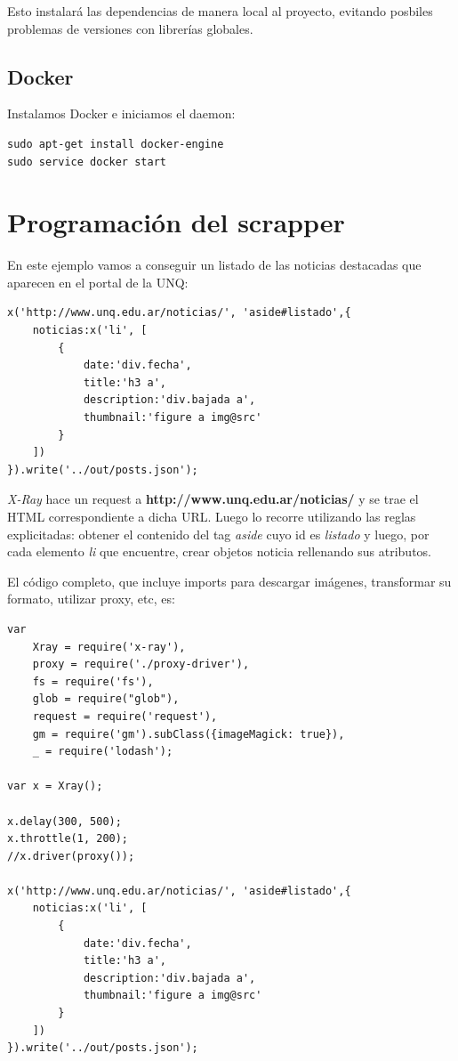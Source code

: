 \documentclass[12pt]{article}
\begin{document}
Esto instalará las dependencias de manera local al proyecto, evitando posbiles problemas de versiones con librerías globales.

\subsection{Docker}

Instalamos Docker e iniciamos el daemon:

\begin{verbatim}
sudo apt-get install docker-engine
sudo service docker start
\end{verbatim}


\section{Programación del scrapper}

En este ejemplo vamos a conseguir un listado de las noticias destacadas que aparecen en el portal de la UNQ:

\begin{verbatim}
x('http://www.unq.edu.ar/noticias/', 'aside#listado',{
    noticias:x('li', [
        {
            date:'div.fecha',
            title:'h3 a',
            description:'div.bajada a',
            thumbnail:'figure a img@src'
        }
    ])
}).write('../out/posts.json');
\end{verbatim}

\textit{X-Ray} hace un request a \textbf{http://www.unq.edu.ar/noticias/} y se trae el HTML correspondiente a dicha URL. Luego lo recorre utilizando las reglas explicitadas:  obtener el contenido del tag \textit{aside} cuyo id es \textit{listado} y luego, por cada elemento \textit{li} que encuentre, crear objetos noticia rellenando sus atributos.

El código completo, que incluye imports para descargar imágenes, transformar su formato, utilizar proxy, etc, es:

\begin{verbatim}
var
    Xray = require('x-ray'),
    proxy = require('./proxy-driver'),
    fs = require('fs'),
    glob = require("glob"),
    request = require('request'),
    gm = require('gm').subClass({imageMagick: true}),
    _ = require('lodash');

var x = Xray();

x.delay(300, 500);
x.throttle(1, 200);
//x.driver(proxy());

x('http://www.unq.edu.ar/noticias/', 'aside#listado',{
    noticias:x('li', [
        {
            date:'div.fecha',
            title:'h3 a',
            description:'div.bajada a',
            thumbnail:'figure a img@src'
        }
    ])
}).write('../out/posts.json');
\end{verbatim}
\end{document}
